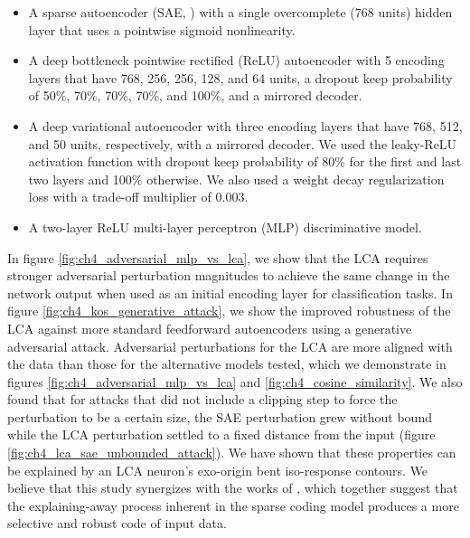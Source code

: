 \begin{itemize}
  \item A sparse autoencoder (SAE, \cite{ng2011sparse}) with a single overcomplete (768 units) hidden layer that uses a pointwise sigmoid nonlinearity.
  \item A deep bottleneck pointwise rectified (ReLU) \parencite{hahnloser2000digital, nair2010rectified} autoencoder with 5 encoding layers that have 768, 256, 256, 128, and 64 units, a dropout keep probability of 50\%, 70\%, 70\%, 70\%, and 100\%, and a mirrored decoder.
  \item A deep variational autoencoder \parencite{kingma2013auto} with three encoding layers that have 768, 512, and 50 units, respectively, with a mirrored decoder. We used the leaky-ReLU activation function \parencite{maas2013rectifier} with dropout keep probability of 80\% for the first and last two layers and 100\% otherwise. We also used a weight decay regularization loss with a trade-off multiplier of 0.003. 
  \item A two-layer ReLU multi-layer perceptron (MLP) discriminative model.
\end{itemize}

In figure \ref{fig:ch4_adversarial_mlp_vs_lca}, we show that the LCA requires stronger adversarial perturbation magnitudes to achieve the same change in the network output when used as an initial encoding layer for classification tasks. In figure \ref{fig:ch4_kos_generative_attack}, we show the improved robustness of the LCA against more standard feedforward autoencoders using a generative adversarial attack. Adversarial perturbations for the LCA are more aligned with the data than those for the alternative models tested, which we demonstrate in figures \ref{fig:ch4_adversarial_mlp_vs_lca} and \ref{fig:ch4_cosine_similarity}. We also found that for attacks that did not include a clipping step to force the perturbation to be a certain size, the SAE perturbation grew without bound while the LCA perturbation settled to a fixed distance from the input (figure \ref{fig:ch4_lca_sae_unbounded_attack}). We have shown that these properties can be explained by an LCA neuron's exo-origin bent iso-response contours. We believe that this study synergizes with the works of \parencite{zhu2013visual, golden2016conjectures, vilankar2017selectivity, olshausen1997sparse}, which together suggest that the explaining-away process inherent in the sparse coding model produces a more selective and robust code of input data.


